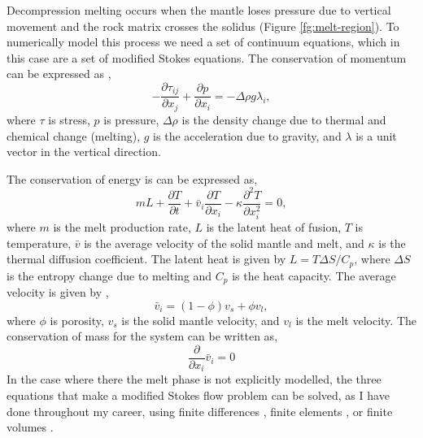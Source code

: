 Decompression melting occurs when the mantle loses pressure due to vertical movement and the rock matrix crosses the solidus (Figure \ref{fg:melt-region}). To numerically model this process we need a set of continuum equations, which in this case are a set of modified Stokes equations. The conservation of momentum can be expressed as \citep[e.g.][]{armitage-etal-jgr-2013},
\begin{equation}
-\frac{\partial \tau_{ij}}{\partial x_{j}} + \frac{\partial p}{\partial x_{i}} = -\Delta\rho g\lambda_{i},
\label{eq:momentum}
\end{equation}
where $\tau$ is stress, $p$ is pressure, $\Delta\rho$ is the density change due to thermal and chemical change (melting), $g$ is the acceleration due to gravity, and $\lambda$ is a unit vector in the vertical direction.

The conservation of energy is can be expressed as,
\begin{equation}
mL + \frac{\partial T}{\partial t} + \bar{v}_{i}\frac{\partial T}{\partial x_{i}} - \kappa\frac{\partial^{2}T}{\partial x_{i}^{2}} = 0,
\label{eq:energy}
\end{equation}
where $m$ is the melt production rate, $L$ is the latent heat of fusion, $T$ is temperature, $\bar{v}$ is the average velocity of the solid mantle and melt, and $\kappa$ is the thermal diffusion coefficient. The latent heat is given by $L = T\Delta S/C_{p}$, where $\Delta S$ is the entropy change due to melting and $C_{p}$ is the heat capacity. The average velocity is given by \citep{scott-1992},
\begin{equation}
\bar{v}_{i} = \left(1-\phi\right)v_{s} + \phi v_{l},
\label{eq:average-velocity}
\end{equation}
where $\phi$ is porosity, $v_{s}$ is the solid mantle velocity, and $v_{l}$ is the melt velocity. The conservation of mass for the system can be written as,
\begin{equation}
\frac{\partial}{\partial x_{i}}\bar{v}_{i} = 0
\label{eq:mass}
\end{equation}
In the case where there the melt phase is not explicitly modelled, the three equations that make a modified Stokes flow problem can be solved, as I have done throughout my career, using finite differences \citep[e.g.][]{armitage-etal-g3-2018}, finite elements \citep[e.g.][]{armitage-etal-2008}, or finite volumes \citep[e.g.][]{civiero-etal-2019}.

